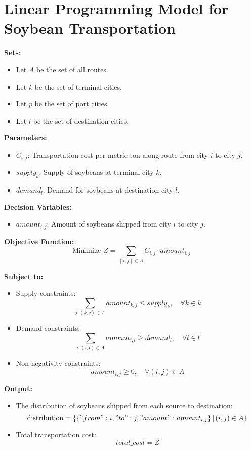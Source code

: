\documentclass{article}
\begin{document}
\section*{Linear Programming Model for Soybean Transportation}

\textbf{Sets:}
\begin{itemize}
    \item Let \( A \) be the set of all routes.
    \item Let \( k \) be the set of terminal cities.
    \item Let \( p \) be the set of port cities.
    \item Let \( l \) be the set of destination cities.
\end{itemize}

\textbf{Parameters:}
\begin{itemize}
    \item \( C_{i,j} \): Transportation cost per metric ton along route from city \( i \) to city \( j \).
    \item \( supply_k \): Supply of soybeans at terminal city \( k \).
    \item \( demand_l \): Demand for soybeans at destination city \( l \).
\end{itemize}

\textbf{Decision Variables:}
\begin{itemize}
    \item \( amount_{i,j} \): Amount of soybeans shipped from city \( i \) to city \( j \).
\end{itemize}

\textbf{Objective Function:}
\[
\text{Minimize } Z = \sum_{(i,j) \in A} C_{i,j} \cdot amount_{i,j}
\]

\textbf{Subject to:}
\begin{itemize}
    \item Supply constraints:
    \[
    \sum_{j, (k,j) \in A} amount_{k,j} \leq supply_k, \quad \forall k \in k
    \]

    \item Demand constraints:
    \[
    \sum_{i, (i,l) \in A} amount_{i,l} \geq demand_l, \quad \forall l \in l
    \]

    \item Non-negativity constraints:
    \[
    amount_{i,j} \geq 0, \quad \forall (i,j) \in A
    \]
\end{itemize}

\textbf{Output:}
\begin{itemize}
    \item The distribution of soybeans shipped from each source to destination:
    \[
    \text{distribution} = \{ \{ "from": i, "to": j, "amount": amount_{i,j} \} \, | \, (i,j) \in A \}
    \]
    \item Total transportation cost:
    \[
    total\_cost = Z
    \]
\end{itemize}
\end{document}
